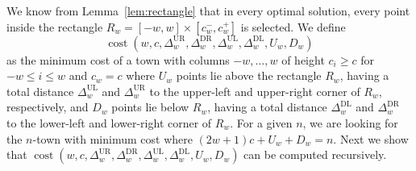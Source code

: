 \documentclass[preprint,authoryear,12pt]{elsarticle}
\DeclareMathOperator{\cost}{cost} \DeclareMathOperator{\dist}{dist}
\begin{document}
We know from Lemma~\ref{lem:rectangle} that in every optimal
solution, every point inside the rectangle $R_w =
[-w,w]\times[c_w^-, c_w^+]$ is selected.
We define
$$\cost(w,c,\Delta_{w}^{\mathrm{UR}},
\Delta_{w}^{\mathrm{DR}}, \Delta_{w}^{\mathrm{UL}},
\Delta_{w}^{\mathrm{DL}},U_w,D_w)$$
as the minimum cost of a town
with columns $-w,\ldots,w$ of height $c_i\ge c$ for $-w\le i\le w$
and $c_w=c$ where $U_w$ points lie above the rectangle $R_w$, having
a total distance $\Delta_w^{\mathrm{UL}}$ and
$\Delta_w^{\mathrm{UR}}$ to the upper-left and upper-right corner of
$R_w$, respectively, and $D_w$ points lie below $R_w$, having a
total distance $\Delta_w^{\mathrm{DL}}$ and $\Delta_w^{\mathrm{DR}}$
to the lower-left and lower-right corner of $R_w$. For a given $n$,
we are looking for the $n$-town with minimum cost where $(2w+1)c +
U_w + D_w = n$. Next we show that
$\cost(w,c,\Delta_{w}^{\mathrm{UR}}, \Delta_{w}^{\mathrm{DR}},
\Delta_{w}^{\mathrm{UL}}, \Delta_{w}^{\mathrm{DL}},U_w,D_w)$ can be
computed recursively.
\end{document}
